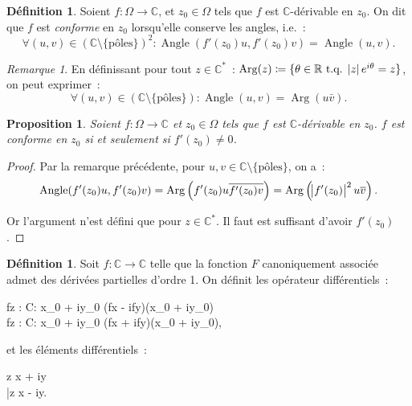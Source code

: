 \documentclass{report}
\newtheorem{prp}[thm]{Proposition}
\theoremstyle{definition}
\newtheorem{déf}[thm]{Définition}
\theoremstyle{remark}
\newtheorem*{rmq}{Remarque}
\numberwithin{equation}{section}
\newcommand{\C}{\mathbb C}
\newcommand{\R}{\mathbb R}
\newcommand{\tq}{\text{ t.q. }}
\DeclareMathOperator{\Angle}{Angle}
\DeclareMathOperator{\Arg}{Arg}
\newcommand{\poles}{{\{\text{pôles}\}}}
\begin{document}
			\begin{déf} Soient $f : \Omega \to \C$, et $z_0 \in \Omega$ tels que $f$ est $\C$-dérivable en $z_0$. On dit que $f$ est \textit{conforme} en $z_0$
			lorsqu'elle conserve les angles, i.e.~:
			\begin{equation}
				\forall (u, v) \in \left(\C \setminus \poles\right)^2 : \Angle(f'(z_0)u, f'(z_0)v) = \Angle(u, v).
			\end{equation}
			\end{déf}

			\begin{rmq} En définissant pour tout $z \in \C^*$~: $\Arg(z) \coloneqq \{\theta \in \R \tq \abs ze^{i\theta} = z\}$, on peut exprimer~:
			\begin{equation}
				\forall (u, v) \in \left(\C \setminus \poles\right) : \Angle(u, v) = \Arg(u\bar v).
			\end{equation}
			\end{rmq}

			\begin{prp} Soient $f : \Omega \to \C$ et $z_0 \in \Omega$ tels que $f$ est $\C$-dérivable en $z_0$. $f$ est conforme en $z_0$ si et seulement si
			$f'(z_0) \neq 0$.
			\end{prp}

			\begin{proof} Par la remarque précédente, pour $u, v \in \C \setminus \poles$, on a~:
			\begin{equation}
				\Angle(f'(z_0)u, f'(z_0)v) = \Arg\left(f'(z_0)u\overline {f'(z_0)v}\right) = \Arg\left(\abs {f'(z_0)}^2u\overline v\right).
			\end{equation}

			Or l'argument n'est défini que pour $z \in \C^*$. Il faut est suffisant d'avoir $f'(z_0)$.
			\end{proof}

			\begin{déf} Soit $f : \C \to \C$ telle que la fonction $F$  canoniquement associée admet des dérivées partielles d'ordre 1. On définit les opérateur
			différentiels~:
			\begin{numcases}{}
				\pd fz : \Omega \to \C : x_0 + iy_0 \mapsto {}\left(\pd fx - i\pd fy\right)(x_0 + iy_0) \\
				\pd f{\overline z} : \Omega \to \C : x_0 + iy_0 \mapsto {}\left(\pd fx + i\pd fy\right)(x_0 + iy_0),
			\end{numcases}
			et les éléments différentiels~:
			\begin{numcases}{}
				\dif z \coloneqq \dif x + i\dif y \\
				\dif \bar z \coloneqq \dif x - i\dif y.
			\end{numcases}
			\end{déf}
\end{document}
